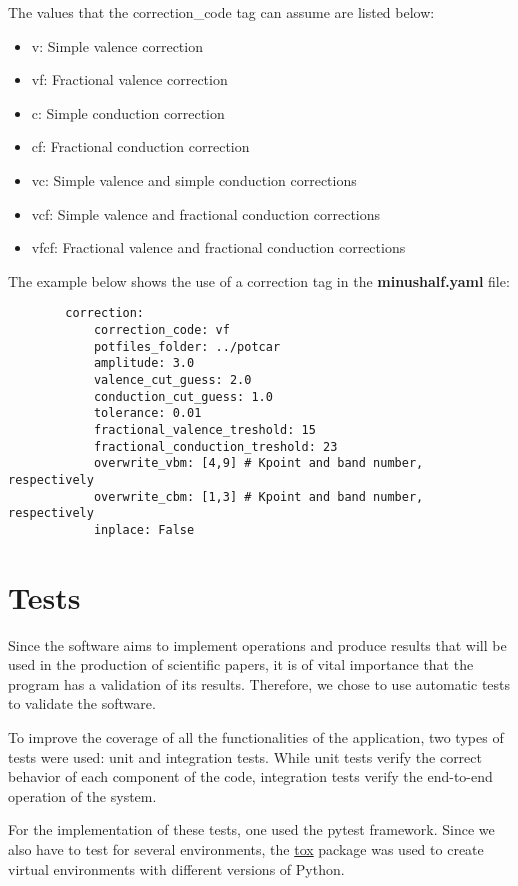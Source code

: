  The values that the correction\_code tag can assume are listed below:
 \begin{itemize}
     \item v: Simple valence correction
     \item vf: Fractional valence correction
     \item c: Simple conduction correction
     \item cf: Fractional conduction correction
     \item vc: Simple valence and simple conduction corrections
     \item vcf: Simple valence and fractional conduction corrections
     \item vfcf: Fractional valence and fractional conduction corrections
 \end{itemize}
 
 The example below shows the use of a correction tag in the \textbf{minushalf.yaml} file:
 
 \begin{verbatim}
        correction:
            correction_code: vf
            potfiles_folder: ../potcar
            amplitude: 3.0
            valence_cut_guess: 2.0
            conduction_cut_guess: 1.0
            tolerance: 0.01
            fractional_valence_treshold: 15
            fractional_conduction_treshold: 23
            overwrite_vbm: [4,9] # Kpoint and band number, respectively
            overwrite_cbm: [1,3] # Kpoint and band number, respectively
            inplace: False
  \end{verbatim}
\section{Tests}
Since the software aims to implement operations and produce results that will be used in the production of scientific papers, it is of vital importance that the program has a validation of its results. Therefore, we chose to use automatic tests to validate the software.

To improve the coverage of all the functionalities of the application, two types of tests were used: unit and integration tests. While unit tests verify the correct behavior of each component of the code, integration tests verify the end-to-end operation of the system.

For the implementation of these tests, one used the pytest framework. Since we also have to test for several environments, the \href{https://tox.readthedocs.io/en/latest/}{tox} package was used to create virtual environments with different versions of Python.

